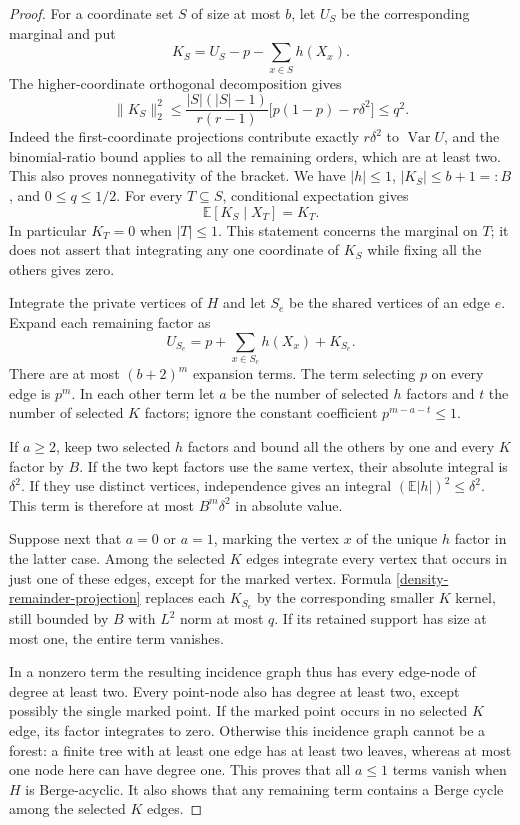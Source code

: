 \documentclass[a4paper,11pt,reqno]{amsart}
\theoremstyle{plain}
\theoremstyle{definition}
\theoremstyle{remark}
\begin{document}
\begin{proof}
For a coordinate set $S$ of size at most $b$, let $U_S$ be the
corresponding marginal and put
\[
 K_S=U_S-p-\sum_{x\in S}h(X_x).
\]
The higher-coordinate orthogonal decomposition gives
\begin{equation}\label{density-higher-remainder}
 \|K_S\|_2^2
 \le\frac{|S|(|S|-1)}{r(r-1)}
        \bigl[p(1-p)-r\delta^2\bigr]\le q^2.
\end{equation}
Indeed the first-coordinate projections contribute exactly
$r\delta^2$ to $\operatorname{Var}U$, and the binomial-ratio
bound applies to all the remaining orders, which are at least two.
This also proves nonnegativity of the bracket.  We have
$|h|\le1$, $|K_S|\le b+1=:B$, and $0\le q\le1/2$.
For every $T\subseteq S$, conditional expectation gives
\begin{equation}\label{density-remainder-projection}
 \mathbb E[K_S\mid X_T]=K_T.
\end{equation}
In particular $K_T=0$ when $|T|\le1$.  This statement concerns
the marginal on $T$; it does not assert that integrating any one
coordinate of $K_S$ while fixing all the others gives zero.

Integrate the private vertices of $H$ and let $S_e$ be the shared
vertices of an edge $e$.  Expand each remaining factor as
\[
 U_{S_e}=p+\sum_{x\in S_e}h(X_x)+K_{S_e}.
\]
There are at most $(b+2)^m$ expansion terms.  The term selecting
$p$ on every edge is $p^m$.  In each other term let $a$ be the
number of selected $h$ factors and $t$ the number of selected
$K$ factors; ignore the constant coefficient $p^{m-a-t}\le1$.

If $a\ge2$, keep two selected $h$ factors and bound all the others
by one and every $K$ factor by $B$.  If the two kept factors use
the same vertex, their absolute integral is $\delta^2$.  If they
use distinct vertices, independence gives an integral
$(\mathbb E|h|)^2\le\delta^2$.  This term is therefore at most
$B^m\delta^2$ in absolute value.

Suppose next that $a=0$ or $a=1$, marking the vertex $x$ of the
unique $h$ factor in the latter case.  Among the selected $K$
edges integrate every vertex that occurs in just one of these
edges, except for the marked vertex.  Formula
\eqref{density-remainder-projection} replaces each $K_{S_e}$ by
the corresponding smaller $K$ kernel, still bounded by $B$ with
$L^2$ norm at most $q$.  If its retained support has size at most
one, the entire term vanishes.

In a nonzero term the resulting incidence graph thus has every
edge-node of degree at least two.  Every point-node also has
degree at least two, except possibly the single marked point.
If the marked point occurs in no selected $K$ edge, its factor
integrates to zero.  Otherwise this incidence graph cannot be a
forest: a finite tree with at least one edge has at least two
leaves, whereas at most one node here can have degree one.
This proves that all $a\le1$ terms vanish when $H$ is Berge-acyclic.
It also shows that any remaining term contains a Berge cycle
among the selected $K$ edges.


\end{proof}
\end{document}
